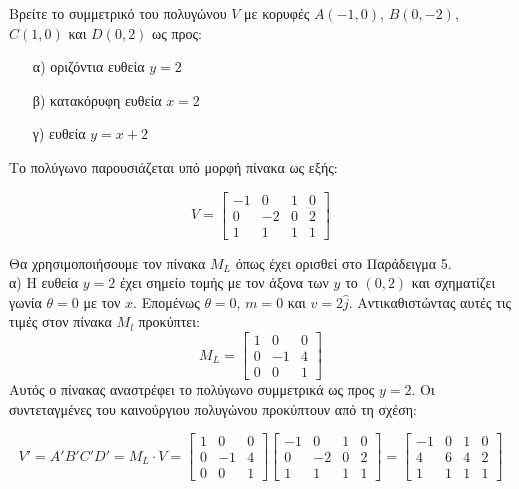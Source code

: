 \begin{example}
 Βρείτε το συμμετρικό του πολυγώνου $V$ με κορυφές $A(-1, 0)$, $B(0, -2)$, $C(1, 0)$ και $D(0, 2)$ ως προς:
\begin{enumerate}
    \item[α)] οριζόντια ευθεία $y=2$
    \item[β)] κατακόρυφη ευθεία $x=2$
    \item[γ)] ευθεία $y=x+2$
\end{enumerate}
\end{example}


\begin{solution}
Το πολύγωνο παρουσιάζεται υπό μορφή πίνακα ως εξής:

\[
V = \begin{bmatrix}
-1 & 0 & 1 & 0 \\
0 & -2 & 0 & 2 \\
1 & 1 & 1 & 1
\end{bmatrix}
\]

Θα χρησιμοποιήσουμε τον πίνακα $M_L$ όπως έχει ορισθεί στο Παράδειγμα 5.\\
α) Η ευθεία $y=2$ έχει σημείο τομής με τον άξονα των $y$ το $(0,2)$ και σχηματίζει γωνία $\theta = 0$ με τον $x$. Επομένως $\theta=0$, $m=0$ και $v=2\hat{j}$. Αντικαθιστώντας αυτές τις τιμές στον πίνακα $M_l$ προκύπτει:
    \[
    M_L = \begin{bmatrix}
    1 & 0 & 0 \\
    0 & -1 & 4 \\
    0 & 0 & 1
    \end{bmatrix}
    \]
Αυτός ο πίνακας αναστρέφει το πολύγωνο συμμετρικά ως προς $y=2$.
Οι συντεταγμένες του καινούργιου πολυγώνου προκύπτουν από τη σχέση:

\[
V' = A'B'C'D' = M_L \cdot V = \begin{bmatrix}
1 & 0 & 0 \\
0 & -1 & 4 \\
0 & 0 & 1
\end{bmatrix}
\begin{bmatrix}
-1 & 0 & 1 & 0 \\
0 & -2 & 0 & 2 \\
1 & 1 & 1 & 1
\end{bmatrix}
= \begin{bmatrix}
-1 & 0 & 1 & 0 \\
4 & 6 & 4 & 2 \\
1 & 1 & 1 & 1
\end{bmatrix}
\]


\end{solution}
